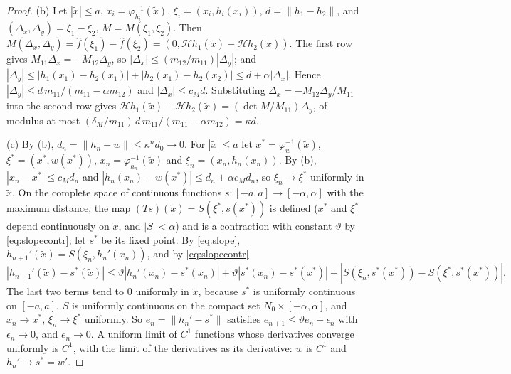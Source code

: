 \documentclass[11pt]{article}
\theoremstyle{definition}
\begin{document}
\begin{proof}
(b) Let $|\tilde x| \le a$, $x_i = \varphi_{h_i}^{-1}(\tilde x)$, $\xi_i = (x_i, h_i(x_i))$, $d = \|h_1 - h_2\|$, and $(\Delta_x, \Delta_y) = \xi_1 - \xi_2$, $M = M(\xi_1, \xi_2)$. Then $M(\Delta_x, \Delta_y) = \hat f(\xi_1) - \hat f(\xi_2) = (0, \mathcal H h_1(\tilde x) - \mathcal H h_2(\tilde x))$. The first row gives $M_{11}\Delta_x = -M_{12}\Delta_y$, so $|\Delta_x| \le (m_{12}/m_{11})|\Delta_y|$; and $|\Delta_y| \le |h_1(x_1) - h_2(x_1)| + |h_2(x_1) - h_2(x_2)| \le d + \alpha|\Delta_x|$. Hence $|\Delta_y| \le d\,m_{11}/(m_{11} - \alpha m_{12})$ and $|\Delta_x| \le c_M d$. Substituting $\Delta_x = -M_{12}\Delta_y/M_{11}$ into the second row gives $\mathcal H h_1(\tilde x) - \mathcal H h_2(\tilde x) = (\det M/M_{11})\Delta_y$, of modulus at most $(\delta_M/m_{11})\,d\,m_{11}/(m_{11} - \alpha m_{12}) = \kappa d$.

(c) By (b), $d_n = \|h_n - w\| \le \kappa^n d_0 \to 0$. For $|\tilde x| \le a$ let $x^* = \varphi_w^{-1}(\tilde x)$, $\xi^* = (x^*, w(x^*))$, $x_n = \varphi_{h_n}^{-1}(\tilde x)$ and $\xi_n = (x_n, h_n(x_n))$. By (b), $|x_n - x^*| \le c_M d_n$ and $|h_n(x_n) - w(x^*)| \le d_n + \alpha c_M d_n$, so $\xi_n \to \xi^*$ uniformly in $\tilde x$. On the complete space of continuous functions $s: [-a, a] \to [-\alpha, \alpha]$ with the maximum distance, the map $(Ts)(\tilde x) = S(\xi^*, s(x^*))$ is defined ($x^*$ and $\xi^*$ depend continuously on $\tilde x$, and $|S| < \alpha$) and is a contraction with constant $\vartheta$ by \eqref{eq:slopecontr}; let $s^*$ be its fixed point. By \eqref{eq:slope}, $h_{n+1}'(\tilde x) = S(\xi_n, h_n'(x_n))$, and by \eqref{eq:slopecontr}
\[
  |h_{n+1}'(\tilde x) - s^*(\tilde x)| \le \vartheta|h_n'(x_n) - s^*(x_n)| + \vartheta|s^*(x_n) - s^*(x^*)| + |S(\xi_n, s^*(x^*)) - S(\xi^*, s^*(x^*))| .
\]
The last two terms tend to $0$ uniformly in $\tilde x$, because $s^*$ is uniformly continuous on $[-a, a]$, $S$ is uniformly continuous on the compact set $N_0 \times [-\alpha, \alpha]$, and $x_n \to x^*$, $\xi_n \to \xi^*$ uniformly. So $e_n = \|h_n' - s^*\|$ satisfies $e_{n+1} \le \vartheta e_n + \epsilon_n$ with $\epsilon_n \to 0$, and $e_n \to 0$. A uniform limit of $C^1$ functions whose derivatives converge uniformly is $C^1$, with the limit of the derivatives as its derivative: $w$ is $C^1$ and $h_n' \to s^* = w'$.


\end{proof}
\end{document}
